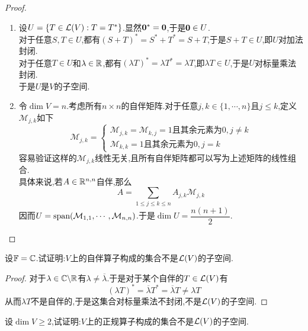 \documentclass{ctexart}
\begin{document}
\begin{proof}
    \begin{enumerate}[label=\tbf{(\arabic*)}]
        \item 设$U=\left\{T\in\mathcal{L}(V):T=T^*\right\}$.显然$\mathbf0^*=\mathbf0$,于是$\mathbf0\in U$.\\
            对于任意$S,T\in U$,都有$(S+T)^*=S^*+T^*=S+T$,于是$S+T\in U$,即$U$对加法封闭.\\
            对于任意$T\in U$和$\lambda\in\mathbb{R}$,都有$\left(\lambda T\right)^*=\lambda T^*=\lambda T$,即$\lambda T\in U$,于是$U$对标量乘法封闭.\\
            于是$U$是$V$的子空间.
        \item 令$\dim V=n$.考虑所有$n\times n$的自伴矩阵.对于任意$j,k\in\{1,\cdots,n\}$且$j\leqslant k$,定义$\mathcal{M}_{j,k}$如下
            \[\mathcal{M}_{j,k}=\left\{\begin{array}{l}
                \mathcal{M}_{j,k}=\mathcal{M}_{k,j}=1\text{且其余元素为}0,j\neq k\\
                \mathcal{M}_{k,k}=1\text{且其余元素为}0,j=k
            \end{array}\right.\]
            容易验证这样的$\mathcal{M}_{j,k}$线性无关,且所有自伴矩阵都可以写为上述矩阵的线性组合.\\
            具体来说,若$A\in\mathbb{R}^{n,n}$自伴,那么
            \[A=\sum_{1\leqslant j\leqslant k\leqslant n}A_{j,k}\mathcal{M}_{j,k}\]
            因而$U=\text{span}(\mathcal{M}_{1,1},\cdots,\mathcal{M}_{n,n})$.于是$\dim U=\dfrac{n(n+1)}{2}$.
    \end{enumerate}
\end{proof}
\begin{problem}[17.]
    设$\mathbb{F}=\mathbb{C}$.试证明:$V$上的自伴算子构成的集合不是$\mathcal{L}(V)$的子空间.
\end{problem}
\begin{proof}
    对于$\lambda\in\mathbb{C}\backslash\mathbb{R}$有$\lambda\neq\overline{\lambda}$.于是对于某个自伴的$T\in\mathcal{L}(V)$有
    \[\left(\lambda T\right)^*=\overline{\lambda}T^*=\overline{\lambda}T\neq\lambda T\]
    从而$\lambda T$不是自伴的,于是这集合对标量乘法不封闭,不是$\mathcal{L}(V)$的子空间.
\end{proof}
\begin{problem}[18.]
    设$\dim V\geqslant2$,试证明:$V$上的正规算子构成的集合不是$\mathcal{L}(V)$的子空间.
\end{problem}
\end{document}
